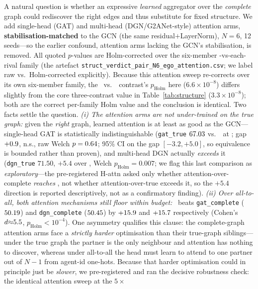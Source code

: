 A natural question is whether an expressive \emph{learned} aggregator over the
\emph{complete} graph could rediscover the right edges and thus substitute for
fixed structure. We add single-head (GAT) and multi-head (DGN/G2ANet-style)
attention arms, \textbf{stabilisation-matched} to the GCN (the same
residual$+$LayerNorm), $N{=}6$, 12 seeds---so the earlier confound, attention
arms lacking the GCN's stabilisation, is removed. All quoted $p$-values are
Holm-corrected over the six-member \gtrue-vs-each-rival family (the artefact
\texttt{struct\_verdict\_pair\_N6\_ego\_attention.csv}; we label raw vs.\
Holm-corrected explicitly). Because this attention sweep re-corrects over its
own six-member family, the \gtrue\ vs.\ \gcomplete\ contrast's $p_{\text{Holm}}$
here ($6.6\times10^{-8}$) differs slightly from the core three-contrast value in
Table~\ref{tab:structure} ($3.3\times10^{-8}$); both are the correct per-family
Holm value and the conclusion is identical. Two facts settle the
question. \emph{(i) The attention arms are not under-trained on the
true graph:} given the
\emph{right} graph, learned attention is at least as good as the GCN---single-head
GAT is statistically indistinguishable (\texttt{gat\_true} $67.03$ vs.\
\gtrue\ at \SCtrueN; gap $+0.9$, n.s., raw Welch $p=0.64$;
95\% CI on the gap $[-3.2, +5.0]$, so equivalence is bounded rather than
proven), and
multi-head DGN actually \emph{exceeds} it (\texttt{dgn\_true} $71.50$, $+5.4$ over
\gtrue, Welch $p_{\text{Holm}}=0.007$; we flag this last comparison as
\emph{exploratory}---the pre-registered H-attn asked only whether
attention-over-complete \emph{reaches} \gtrue, not whether attention-over-true
exceeds it, so the $+5.4$ direction is reported descriptively, not as a
confirmatory finding). \emph{(ii) Over
all-to-all, both attention mechanisms still floor within budget:} \gtrue\ beats
\texttt{gat\_complete} ($50.19$) and \texttt{dgn\_complete}
($50.45$) by $+15.9$ and $+15.7$
respectively (Cohen's $d{\approx}5.5$, $p_{\text{Holm}}<10^{-4}$).
One asymmetry qualifies this clause: the complete-graph
attention arms face a \emph{strictly harder} optimisation than their true-graph
siblings---under the true graph the partner is the only neighbour and attention
has nothing to discover, whereas under all-to-all the head must learn to attend
to one partner out of $N{-}1$ from agent-id one-hots. Because that harder
optimisation could in principle just be \emph{slower}, we pre-registered and ran
the decisive robustness check: the identical attention sweep at the $5\times$
